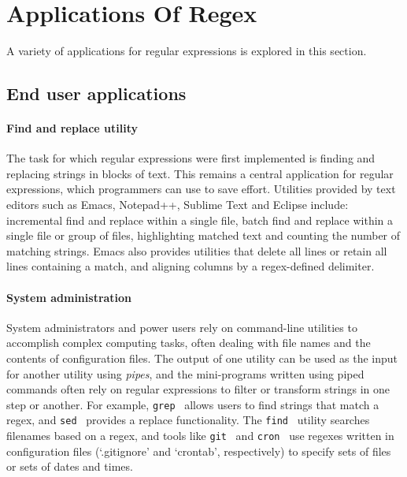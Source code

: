 \section{Applications Of Regex}
\label{sec:applications}
A variety of applications for regular expressions is explored in this section.

\subsection{End user applications}
\paragraph{Find and replace utility}  The task for which regular expressions were first implemented is finding and replacing strings in blocks of text.  This remains a central application for regular expressions, which programmers can use to save effort.  Utilities provided by text editors such as Emacs, Notepad++, Sublime Text and Eclipse include: incremental find and replace within a single file, batch find and replace within a single file or group of files, highlighting matched text and counting the number of matching strings.  Emacs also provides utilities that delete all lines or retain all lines containing a match, and aligning columns by a regex-defined delimiter.

\paragraph{System administration}  System administrators and power users rely on command-line utilities to accomplish complex computing tasks, often dealing with file names and the contents of configuration files.  The output of one utility can be used as the input for another utility using \emph{pipes}, and the mini-programs written using piped commands often rely on regular expressions to filter or transform strings in one step or another.  For example, {\tt grep}~ allows users to find strings that match a regex, and {\tt sed}~ provides a replace functionality.  The {\tt find}~ utility searches filenames based on a regex, and tools like {\tt git}~ and {\tt cron}~ use regexes written in configuration files (`.gitignore' and `crontab', respectively) to specify sets of files or sets of dates and times.

